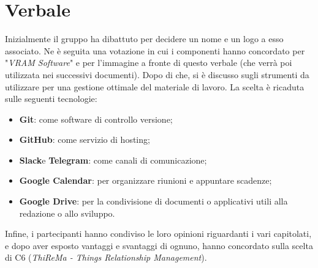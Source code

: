 \section{Verbale}
    Inizialmente il gruppo ha dibattuto per decidere un nome e un logo a esso associato. Ne è seguita una votazione in cui i componenti hanno
    concordato per "\textit{VRAM Software}" e per l'immagine a fronte di questo verbale (che verrà poi utilizzata nei successivi documenti). Dopo di che, si è discusso
    sugli strumenti da utilizzare per una gestione ottimale del materiale di lavoro. La scelta è ricaduta sulle seguenti tecnologie:
    \begin{itemize}
        \item \textbf{Git}\glo: come software di controllo versione;
        \item \textbf{GitHub}\glo: come servizio di hosting;
        \item \textbf{Slack}\glo e \textbf{Telegram}\glo: come canali di comunicazione;
        \item \textbf{Google Calendar}\glo: per organizzare riunioni e appuntare scadenze;
        \item \textbf{Google Drive}\glo: per la condivisione di documenti o applicativi utili alla redazione o allo sviluppo.
    \end{itemize}
    Infine, i partecipanti hanno condiviso le loro opinioni riguardanti i vari capitolati\glo, e dopo aver esposto vantaggi e svantaggi di ognuno, hanno concordato sulla
    scelta di C6 (\textit{ThiReMa - Things Relationship Management}).

        
    


    